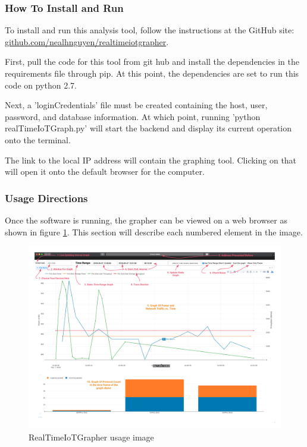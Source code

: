 \subsubsection{How To Install and Run}
To install and run this analysis tool, follow the instructions at the GitHub site:   \href{https://github.com/nealhnguyen/RealTimeIoTGrapher}{github.com/nealhnguyen/realtimeiotgrapher}.

First, pull the code for this tool from git hub and install the dependencies in the requirements file through pip. At this point, the dependencies are set to run this code on python 2.7.

Next, a 'loginCredentials' file must be created containing the host, user, password, and database information. At which point, running 'python realTimeIoTGraph.py' will start the backend and display its current operation onto the terminal.

The link to the local IP address will contain the graphing tool. Clicking on that will open it onto the default browser for the computer.

\subsubsection{Usage Directions}
Once the software is running, the grapher can be viewed on a web browser as shown in figure \ref{fig:grapherUsage}. This section will describe each numbered element in the image.

\begin{figure}[H]
    \centering
    \includegraphics[width=1\textwidth]{figures/grapherUsage.png}
    \caption{RealTimeIoTGrapher usage image}
    \label{fig:grapherUsage}
\end{figure}


